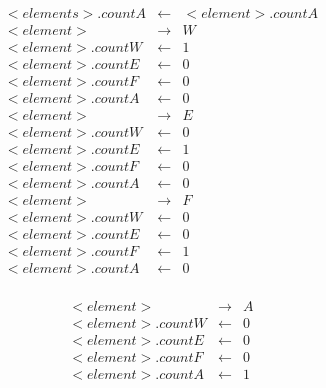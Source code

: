 \documentclass[fleqn]{article}
\begin{document}
\begin{eqnarray*}
<elements>.countA &\leftarrow& <element>.countA\\
<element> &\rightarrow& W\\
<element>.countW &\leftarrow& 1\\
<element>.countE &\leftarrow& 0\\
<element>.countF &\leftarrow& 0\\
<element>.countA &\leftarrow& 0\\
<element> &\rightarrow& E\\
<element>.countW &\leftarrow& 0\\
<element>.countE &\leftarrow& 1\\
<element>.countF &\leftarrow& 0\\
<element>.countA &\leftarrow& 0\\
<element> &\rightarrow& F\\
<element>.countW &\leftarrow& 0\\
<element>.countE &\leftarrow& 0\\
<element>.countF &\leftarrow& 1\\
<element>.countA &\leftarrow& 0\\

\end{eqnarray*}



\begin{eqnarray*}
<element> &\rightarrow& A\\
<element>.countW &\leftarrow& 0\\
<element>.countE &\leftarrow& 0\\
<element>.countF &\leftarrow& 0\\
<element>.countA &\leftarrow& 1
\end{eqnarray*}
\end{document}
